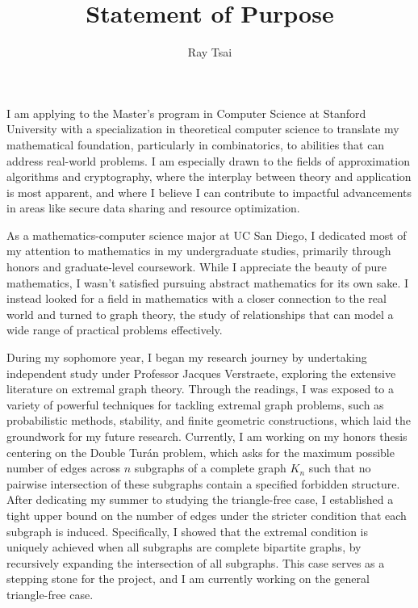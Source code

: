\documentclass[12pt]{article}
\title{Statement of Purpose}
\author{Ray Tsai}
\date{}
\begin{document}
\maketitle

\vspace{-0.25in}

I am applying to the Master's program in Computer Science at Stanford University with a
specialization in theoretical computer science to translate my mathematical foundation, particularly
in combinatorics, to abilities that can address real-world problems. I am especially drawn to the
fields of approximation algorithms and cryptography, where the interplay between theory and
application is most apparent, and where I believe I can contribute to impactful advancements in
areas like secure data sharing and resource optimization.

As a mathematics-computer science major at UC San Diego, I dedicated most of my attention to
mathematics in my undergraduate studies, primarily through honors and graduate-level coursework.
While I appreciate the beauty of pure mathematics, I wasn't satisfied pursuing abstract mathematics
for its own sake. I instead looked for a field in mathematics with a closer connection to the real
world and turned to graph theory, the study of relationships that can model a wide range of
practical problems effectively.

During my sophomore year, I began my research journey by undertaking independent study under
Professor Jacques Verstraete, exploring the extensive literature on extremal graph theory. Through
the readings, I was exposed to a variety of powerful techniques for tackling extremal graph
problems, such as probabilistic methods, stability, and finite geometric constructions, which laid
the groundwork for my future research. Currently, I am working on my honors thesis centering on the
Double Turán problem, which asks for the maximum possible number of edges across $n$ subgraphs of a
complete graph $K_n$ such that no pairwise intersection of these subgraphs contain a specified
forbidden structure. After dedicating my summer to studying the triangle-free case, I established a
tight upper bound on the number of edges under the stricter condition that each subgraph is induced.
Specifically, I showed that the extremal condition is uniquely achieved when all subgraphs are
complete bipartite graphs, by recursively expanding the intersection of all subgraphs. This case
serves as a stepping stone for the project, and I am currently working on the general triangle-free
case. 
\end{document}
